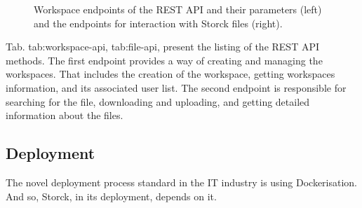 \begin{figure}
\quad
{}

\label{tab:storck_rest_api}
    \caption{ Workspace endpoints of the REST API and their parameters (left) and the endpoints for interaction with Storck files (right). }
\end{figure}

Tab. {tab:workspace-api}, {tab:file-api}, present the listing of the REST API methods.
The first endpoint provides a way of creating and managing the workspaces. That includes the creation of the workspace, getting workspaces information, and its associated user list.
The second endpoint is responsible for searching for the file, downloading and uploading, and getting detailed information about the files.

\subsection{Deployment}

The novel deployment process standard in the IT industry is using Dockerisation.
And so, Storck, in its deployment, depends on it.

